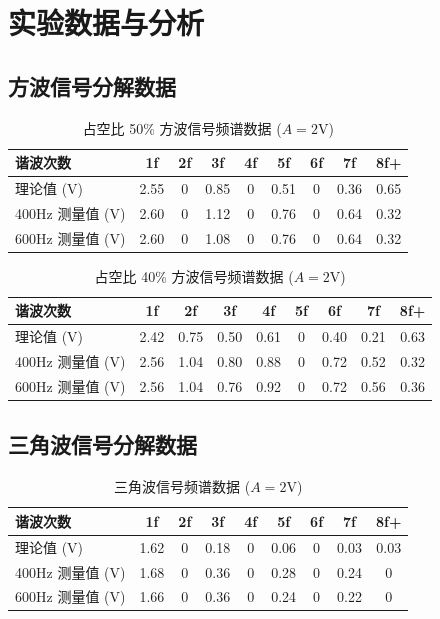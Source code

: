 \documentclass[12pt]{ctexart}
\begin{document}
\section{实验数据与分析}
\subsection{方波信号分解数据}
\begin{table}[H]
    \centering
    \caption{占空比 50\% 方波信号频谱数据 ($A=2\text{V}$)}
    \label{tab:sq50}
    \begin{tabular}{lcccccccc}
        \toprule
        \textbf{谐波次数} & \textbf{1f} & \textbf{2f} & \textbf{3f} & \textbf{4f} & \textbf{5f} & \textbf{6f} & \textbf{7f} & \textbf{8f+} \\
        \midrule
        理论值 (V) & 2.55 & 0 & 0.85 & 0 & 0.51 & 0 & 0.36 & 0.65 \\
        400Hz 测量值 (V) & 2.60 & 0 & 1.12 & 0 & 0.76 & 0 & 0.64 & 0.32 \\
        600Hz 测量值 (V) & 2.60 & 0 & 1.08 & 0 & 0.76 & 0 & 0.64 & 0.32 \\
        \bottomrule
    \end{tabular}
\end{table}
\begin{table}[H]
    \centering
    \caption{占空比 40\% 方波信号频谱数据 ($A=2\text{V}$)}
    \label{tab:sq40}
    \begin{tabular}{lcccccccc}
        \toprule
        \textbf{谐波次数} & \textbf{1f} & \textbf{2f} & \textbf{3f} & \textbf{4f} & \textbf{5f} & \textbf{6f} & \textbf{7f} & \textbf{8f+} \\
        \midrule
        理论值 (V) & 2.42 & 0.75 & 0.50 & 0.61 & 0 & 0.40 & 0.21 & 0.63 \\
        400Hz 测量值 (V) & 2.56 & 1.04 & 0.80 & 0.88 & 0 & 0.72 & 0.52 & 0.32 \\
        600Hz 测量值 (V) & 2.56 & 1.04 & 0.76 & 0.92 & 0 & 0.72 & 0.56 & 0.36 \\
        \bottomrule
    \end{tabular}
\end{table}
\subsection{三角波信号分解数据}
\begin{table}[H]
    \centering
    \caption{三角波信号频谱数据 ($A=2\text{V}$)}
    \label{tab:tri}
    \begin{tabular}{lcccccccc}
        \toprule
        \textbf{谐波次数} & \textbf{1f} & \textbf{2f} & \textbf{3f} & \textbf{4f} & \textbf{5f} & \textbf{6f} & \textbf{7f} & \textbf{8f+} \\
        \midrule
        理论值 (V) & 1.62 & 0 & 0.18 & 0 & 0.06 & 0 & 0.03 & 0.03 \\
        400Hz 测量值 (V) & 1.68 & 0 & 0.36 & 0 & 0.28 & 0 & 0.24 & 0 \\
        600Hz 测量值 (V) & 1.66 & 0 & 0.36 & 0 & 0.24 & 0 & 0.22 & 0 \\
        \bottomrule
    \end{tabular}
\end{table}
\end{document}

